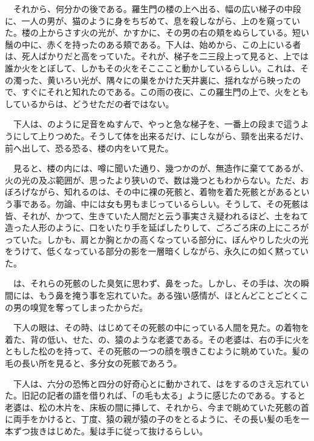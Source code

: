 \documentclass[a4j,twocolumn]{tarticle}
\begin{document}
　それから、何分かの後である。羅生門の楼の上へ出る、幅の広い梯子の中段に、一人の男が、猫のように身をちぢめて、息を殺しながら、上のを窺っていた。楼の上からさす火の光が、かすかに、その男の右の頬をぬらしている。短い鬚の中に、赤くを持ったのある頬である。下人は、始めから、この上にいる者は、死人ばかりだと高をっていた。それが、梯子を二三段上って見ると、上では誰か火をとぼして、しかもその火をそこここと動かしているらしい。これは、その濁った、黄いろい光が、隅々にの巣をかけた天井裏に、揺れながら映ったので、すぐにそれと知れたのである。この雨の夜に、この羅生門の上で、火をともしているからは、どうせただの者ではない。\par{}
　下人は、のように足音をぬすんで、やっと急な梯子を、一番上の段まで這うようにして上りつめた。そうして体を出来るだけ、にしながら、頸を出来るだけ、前へ出して、恐る恐る、楼の内をいて見た。\par{}
　見ると、楼の内には、噂に聞いた通り、幾つかのが、無造作に棄ててあるが、火の光の及ぶ範囲が、思ったより狭いので、数は幾つともわからない。ただ、おぼろげながら、知れるのは、その中に裸の死骸と、着物を着た死骸とがあるという事である。勿論、中には女も男もまじっているらしい。そうして、その死骸は皆、それが、かつて、生きていた人間だと云う事実さえ疑われるほど、土をねて造った人形のように、口をいたり手を延ばしたりして、ごろごろ床の上にころがっていた。しかも、肩とか胸とかの高くなっている部分に、ぼんやりした火の光をうけて、低くなっている部分の影を一層暗くしながら、永久にの如く黙っていた。\par{}
　は、それらの死骸のした臭気に思わず、鼻をった。しかし、その手は、次の瞬間には、もう鼻を掩う事を忘れていた。ある強い感情が、ほとんどことごとくこの男の嗅覚を奪ってしまったからだ。\par{}
　下人の眼は、その時、はじめてその死骸の中にっている人間を見た。の着物を着た、背の低い、せた、の、猿のような老婆である。その老婆は、右の手に火をともした松のを持って、その死骸の一つの顔を覗きこむように眺めていた。髪の毛の長い所を見ると、多分女の死骸であろう。\par{}
　下人は、六分の恐怖と四分の好奇心とに動かされて、はをするのさえ忘れていた。旧記の記者の語を借りれば、「の毛も太る」ように感じたのである。すると老婆は、松の木片を、床板の間に挿して、それから、今まで眺めていた死骸の首に両手をかけると、丁度、猿の親が猿の子のをとるように、その長い髪の毛を一本ずつ抜きはじめた。髪は手に従って抜けるらしい。\par{}
\end{document}

